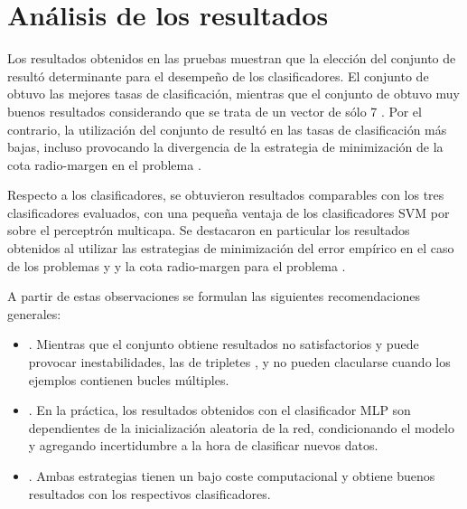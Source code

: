 %
%
%
\section{Análisis de los resultados}
%
Los resultados obtenidos en las pruebas muestran que la elección del
conjunto de  resultó determinante para el desempeño de los
clasificadores.
El conjunto de   obtuvo las mejores tasas de
clasificación, mientras que el conjunto de   obtuvo
muy buenos resultados considerando que se trata de un vector de sólo 7
.
Por el contrario, la utilización del conjunto de  
resultó en las tasas de clasificación más bajas, incluso provocando la
divergencia de la estrategia de minimización de la cota radio-margen
en el problema \prob\mipred{}.

Respecto a los clasificadores, se obtuvieron resultados comparables
con los tres clasificadores evaluados, con una pequeña ventaja de los
clasificadores SVM por sobre el perceptrón multicapa.
Se destacaron en particular los resultados obtenidos al utilizar las
estrategias de minimización del error empírico en el caso de los
problemas \prob\mipred{} y \prob\micropred{} y la cota radio-margen
para el problema \prob\tripletsvm{}.

A partir de estas observaciones se formulan las siguientes
recomendaciones generales:
%
\begin{itemize}
\item
  .
  Mientras que el conjunto  obtiene resultados no
  satisfactorios y puede provocar inestabilidades, las  de
  tripletes ,  y  no pueden clacularse
  cuando los ejemplos contienen bucles múltiples.
\item
  .
  En la práctica, los resultados obtenidos con el clasificador MLP son
  dependientes de la inicialización aleatoria de la red, condicionando
  el modelo y agregando incertidumbre a la hora de clasificar nuevos
  datos.
\item
  .
  Ambas estrategias tienen un bajo coste computacional y obtiene
  buenos resultados con los respectivos clasificadores.
\end{itemize}
%
